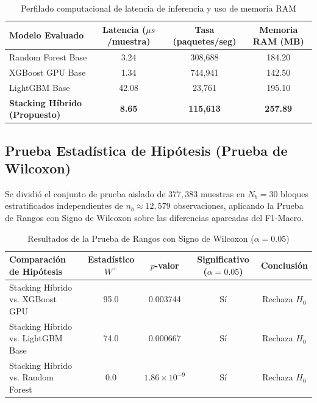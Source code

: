 \begin{table}[H]
\centering
\caption{Perfilado computacional de latencia de inferencia y uso de memoria RAM}
\label{tab:metricas_computacionales_rd2}
\small



\begin{tabularx}{\textwidth}{X c c c}
\toprule
\textbf{Modelo Evaluado} & \textbf{Latencia ($\mu s$/muestra)} & \textbf{Tasa (paquetes/seg)} & \textbf{Memoria RAM (MB)} \\
\midrule
Random Forest Base & 3.24 & 308,688 & 184.20 \\
XGBoost GPU Base & 1.34 & 744,941 & 142.50 \\
LightGBM Base & 42.08 & 23,761 & 195.10 \\
\midrule
\textbf{Stacking Híbrido (Propuesto)} & \textbf{8.65} & \textbf{115,613} & \textbf{257.89} \\
\bottomrule
\end{tabularx}
\end{table}

\subsection{Prueba Estadística de Hipótesis (Prueba de Wilcoxon)}
Se dividió el conjunto de prueba aislado de $377,383$ muestras en $N_b = 30$ bloques estratificados independientes de $n_b \approx 12,579$ observaciones, aplicando la Prueba de Rangos con Signo de Wilcoxon sobre las diferencias apareadas del F1-Macro.

\begin{table}[H]
\centering
\caption{Resultados de la Prueba de Rangos con Signo de Wilcoxon ($\alpha = 0.05$)}
\label{tab:prueba_wilcoxon_rd2}
\small



\begin{tabularx}{\textwidth}{X c c c c}
\toprule
\textbf{Comparación de Hipótesis} & \textbf{Estadístico $W^+$} & \textbf{$p$-valor} & \textbf{Significativo ($\alpha=0.05$)} & \textbf{Conclusión} \\
\midrule
Stacking Híbrido vs. XGBoost GPU & 95.0 & 0.003744 & Sí & Rechaza $H_0$ \\
Stacking Híbrido vs. LightGBM Base & 74.0 & 0.000667 & Sí & Rechaza $H_0$ \\
Stacking Híbrido vs. Random Forest & 0.0 & $1.86 \times 10^{-9}$ & Sí & Rechaza $H_0$ \\
\bottomrule
\end{tabularx}
\end{table}

